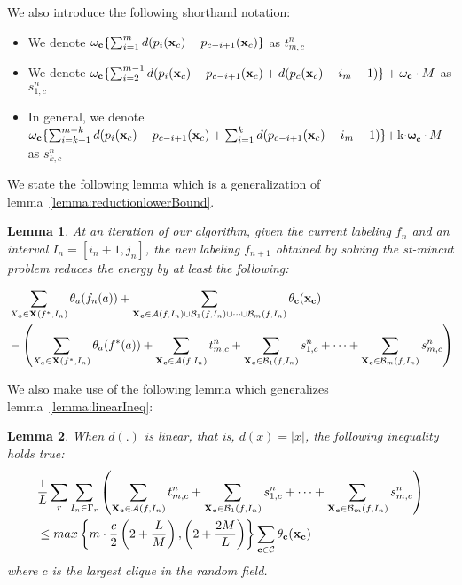\documentclass[10pt,letterpaper]{article}
\newtheorem{lemma}{Lemma}
\begin{document}
We also introduce the following shorthand notation:

\begin{itemize}
	\item We denote $\mathbf{\omega_c}\{\sum_{i = 1}^{m} d(p_i({\bf x}_c) - p_{c - i + 1}({\bf x}_c)\} $ as $t_{m, c}^n$
	\item We denote $\mathbf{\omega_c}\{\sum_{i = 2}^{m - 1} d(p_i({\bf x}_c) - p_{c - i + 1}({\bf x}_c) +  d(p_{c}({\bf x}_c) - i_m - 1) \} +  \mathbf{\omega_c}\cdot M$ as $s_{1, c}^n$
	\item In general, we denote $\mathbf{\omega_c}\{\sum_{i = k + 1}^{m - k} d(p_i({\bf x}_c) - p_{c - i + 1}({\bf x}_c) + \sum_{i = 1}^{k} d(p_{c - i + 1}({\bf x}_c) - i_m - 1) \} + $k$ \cdot  \mathbf{\omega_c}\cdot M$ as $s_{k, c}^n$
\end{itemize}

We state the following lemma which is a generalization of lemma~\ref{lemma:reductionlowerBound}.

\begin{lemma}
At an iteration of our algorithm, given the current labeling $f_n$ and an interval $I_n = [i_n + 1, j_n]$, the new labeling $f_{n+1}$ obtained by solving the st-mincut problem reduces the energy by at least the following:

\begin{equation*}
	\begin{split}
		& \sum_{X_a \in {\bf X}(f^*, I_{n})} \theta_{a}(f_n(a)) + \sum_{{\bf X_c} \in \mathcal{A}\mathit(f, I_n) \cup \mathcal{B}_1\mathit(f, I_n) \cup \dots  \cup \mathcal{B}_m\mathit(f, I_n)} \theta_{\bf c}({\bf x_c}) \\
		&	  - \left( \sum_{X_a \in {\bf X}(f^*, I_{n})} \theta_{a}(f^*(a)) + \sum_{{\bf X_c} \in \mathcal{A}\mathit(f, I_n)} t_{m, c}^n 
	 +  \sum_{{\bf X_c} \in \mathcal{B}_1\mathit(f, I_n)} s_{1, c}^n +  \dots + \sum_{{\bf X_c} \in \mathcal{B}_m\mathit(f, I_n)} s_{m, c}^n \right) 
	 \end{split}
\end{equation*}
\label{lemma:mreductionlowerBound}
\end{lemma}

We also make use of the following lemma which generalizes lemma~\ref{lemma:linearIneq}:

\begin{lemma}
When $d(.)$ is linear, that is, $d(x) = |x|$, the following inequality holds true:
\begin{equation}
\begin{split}
& \frac{1}{L}\sum_{r}\sum_{I_n \in \Gamma_r}\left(\sum_{{\bf X_c} \in \mathcal{A}\mathit(f, I_n)} t_{m, c}^n +  \sum_{{\bf X_c} \in \mathcal{B}_1\mathit(f, I_n)} s_{1, c}^n +  \dots + \sum_{{\bf X_c} \in \mathcal{B}_m\mathit(f, I_n)} s_{m, c}^n \right) \\
& \leq  max \left\{ m \cdot \frac{c}{2}\left(2 + \frac{L}{M}\right), \left(2 + \frac{2M}{L}\right) \right\} \sum_{{\bf c} \in \mathcal{C}} \theta_{\bf c}(\bf {x_c})
\end{split}
\end{equation}
where $\mathit{c}$ is the largest clique in the random field.
\label{lemma:mlinearIneq}
\end{lemma}
\end{document}
